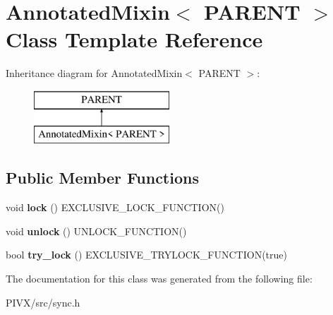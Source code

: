 \hypertarget{class_annotated_mixin}{}\section{Annotated\+Mixin$<$ P\+A\+R\+E\+NT $>$ Class Template Reference}
\label{class_annotated_mixin}
Inheritance diagram for Annotated\+Mixin$<$ P\+A\+R\+E\+NT $>$\+:\begin{figure}[H]
\begin{center}
\leavevmode
\includegraphics[height=2.000000cm]{class_annotated_mixin}
\end{center}
\end{figure}
\subsection*{Public Member Functions}
\begin{DoxyCompactItemize}
\item 
\mbox{\label{class_annotated_mixin_ad1f35c6d1b8a8e980fff45e7e7cb46d3}} 
void {\bfseries lock} () E\+X\+C\+L\+U\+S\+I\+V\+E\+\_\+\+L\+O\+C\+K\+\_\+\+F\+U\+N\+C\+T\+I\+ON()
\item 
\mbox{\label{class_annotated_mixin_acc2e3da37c2d9dd483b859572e32bc24}} 
void {\bfseries unlock} () U\+N\+L\+O\+C\+K\+\_\+\+F\+U\+N\+C\+T\+I\+ON()
\item 
\mbox{\label{class_annotated_mixin_a9a33deab2da56790d8b5d30b1fd8350d}} 
bool {\bfseries try\+\_\+lock} () E\+X\+C\+L\+U\+S\+I\+V\+E\+\_\+\+T\+R\+Y\+L\+O\+C\+K\+\_\+\+F\+U\+N\+C\+T\+I\+ON(true)
\end{DoxyCompactItemize}


The documentation for this class was generated from the following file\+:\begin{DoxyCompactItemize}
\item 
P\+I\+V\+X/src/sync.\+h\end{DoxyCompactItemize}
